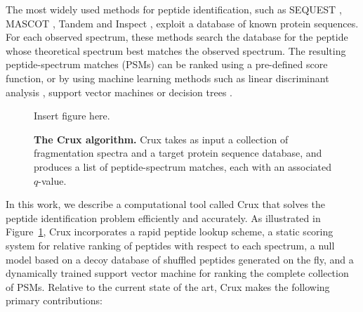 \documentclass{bioinfo}
\begin{document}
The most widely used methods for peptide identification, such as
SEQUEST \cite{eng:approach}, MASCOT \cite{}, Tandem \cite{} and
Inspect \cite{}, exploit a database of known protein sequences.  For
each observed spectrum, these methods search the database for the
peptide whose theoretical spectrum best matches the observed spectrum.
The resulting peptide-spectrum matches (PSMs) can be ranked using a
pre-defined score function, or by using machine learning methods such
as linear discriminant analysis \cite{}, support vector machines
\cite{} or decision trees \cite{}.

\begin{figure}
\centering
Insert figure here.
\caption{{\bf The Crux algorithm.}  Crux takes as input a collection
  of fragmentation spectra and a target protein sequence database, and
  produces a list of peptide-spectrum matches, each with an associated
  $q$-value.
  \label{figure:crux}}
\end{figure}

In this work, we describe a computational tool called Crux that solves
the peptide identification problem efficiently and accurately.  As
illustrated in Figure~\ref{figure:crux}, Crux incorporates a rapid
peptide lookup scheme, a static scoring system for relative ranking of
peptides with respect to each spectrum, a null model based on a decoy
database of shuffled peptides generated on the fly, and a dynamically
trained support vector machine for ranking the complete collection of
PSMs.  Relative to the current state of the art, Crux makes the
following primary contributions:
\end{document}
